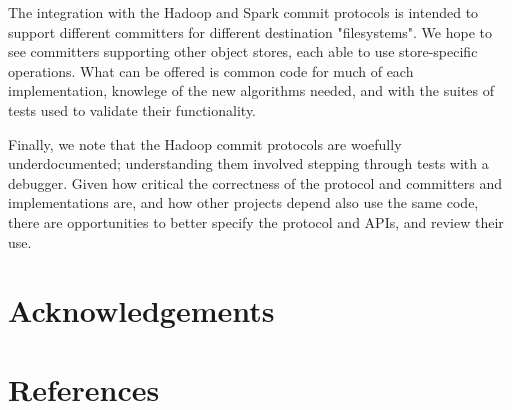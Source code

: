 \documentclass[conference]{IEEEtran}
\begin{document}
The integration with the Hadoop and Spark commit protocols is intended
to support different committers for different destination "filesystems".
We hope to see committers supporting other object stores, each
able to use store-specific operations.
What can be offered is common code for much of each implementation,
knowlege of the new algorithms needed, and
with the suites of tests used to validate their functionality.


Finally, we note that the Hadoop commit protocols are woefully underdocumented;
understanding them involved stepping through tests with a debugger.
Given how critical the correctness of the protocol and committers and implementations
are, and how other projects depend also use the same code, there
are opportunities to better specify the protocol and APIs, and review
their use.


\section*{Acknowledgements}
\label{sec:acknowledgements}


\section{References}
\label{sec:references}




\end{document}
